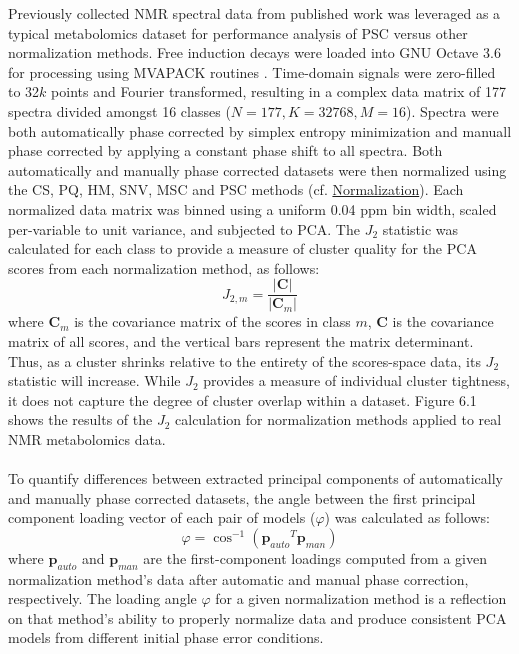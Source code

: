 \begin{doublespace}
Previously collected \hnmr{} NMR spectral data from published work
\cite{halouska:acscb2012} was leveraged as a typical metabolomics dataset
for performance analysis of PSC versus other normalization methods. Free
induction decays were loaded into GNU Octave 3.6 \cite{eaton2008} for
processing using MVAPACK routines \cite{worley:acscb2014}. Time-domain signals
were zero-filled to 32$k$ points and Fourier transformed, resulting in
a complex data matrix of 177 spectra divided amongst 16 classes
($N = 177, K = 32768, M = 16$). Spectra were both automatically phase corrected
by simplex entropy minimization \cite{chen:jmr2002} and manuall phase corrected
by applying a constant phase shift to all spectra. Both automatically and
manually phase corrected datasets were then normalized using the CS, PQ, HM,
SNV, MSC and PSC methods (cf. \hyperlink{subsection.3.4.3}{Normalization}).
Each normalized data matrix was binned using a uniform 0.04 ppm bin width,
scaled per-variable to unit variance, and subjected to PCA. The $J_2$ statistic
\cite{koutroumbas2006} was calculated for each class to provide a measure of
cluster quality for the PCA scores from each normalization method, as follows:
\begin{equation}
J_{2,m} = \frac{|\mathbf{C}|}{|\mathbf{C}_m|}
\end{equation}
where $\mathbf{C}_m$ is the covariance matrix of the scores in class $m$,
$\mathbf{C}$ is the covariance matrix of all scores, and the vertical bars
represent the matrix determinant. Thus, as a cluster shrinks relative to the
entirety of the scores-space data, its $J_2$ statistic will increase. While
$J_2$ provides a measure of individual cluster tightness, it does not capture
the degree of cluster overlap within a dataset. Figure 6.1 shows the results
of the $J_2$ calculation for normalization methods applied to real \hnmr{}
NMR metabolomics data.
\\\\
To quantify differences between extracted principal components of automatically
and manually phase corrected datasets, the angle between the first principal
component loading vector of each pair of models ($\varphi$) was calculated as
follows:
\begin{equation}
\varphi = \cos^{-1}\left( {\mathbf{p}_{auto}}^T \mathbf{p}_{man} \right)
\end{equation}
where $\mathbf{p}_{auto}$ and $\mathbf{p}_{man}$ are the first-component
loadings computed from a given normalization method's data after automatic
and manual phase correction, respectively. The loading angle $\varphi$ for a
given normalization method is a reflection on that method's ability to properly
normalize data and produce consistent PCA models from different initial phase
error conditions.
\end{doublespace}

